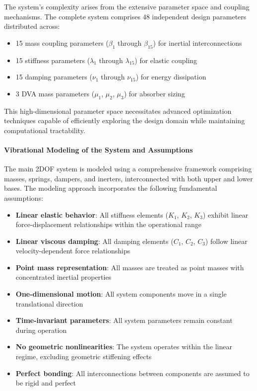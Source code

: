 \documentclass[12pt,a4paper]{article}
\begin{document}
The system's complexity arises from the extensive parameter space and coupling mechanisms. The complete system comprises 48 independent design parameters distributed across:
\begin{itemize}
    \item 15 mass coupling parameters ($\beta_1$ through $\beta_{15}$) for inertial interconnections
    \item 15 stiffness parameters ($\lambda_1$ through $\lambda_{15}$) for elastic coupling
    \item 15 damping parameters ($\nu_1$ through $\nu_{15}$) for energy dissipation
    \item 3 DVA mass parameters ($\mu_1$, $\mu_2$, $\mu_3$) for absorber sizing
\end{itemize}

This high-dimensional parameter space necessitates advanced optimization techniques capable of efficiently exploring the design domain while maintaining computational tractability.

\paragraph{Vibrational Modeling of the System and Assumptions}

The main 2DOF system is modeled using a comprehensive framework comprising masses, springs, dampers, and inerters, interconnected with both upper and lower bases. The modeling approach incorporates the following fundamental assumptions:

\begin{itemize}
    \item \textbf{Linear elastic behavior}: All stiffness elements ($K_1$, $K_2$, $K_3$) exhibit linear force-displacement relationships within the operational range
    \item \textbf{Linear viscous damping}: All damping elements ($C_1$, $C_2$, $C_3$) follow linear velocity-dependent force relationships
    \item \textbf{Point mass representation}: All masses are treated as point masses with concentrated inertial properties
    \item \textbf{One-dimensional motion}: All system components move in a single translational direction
    \item \textbf{Time-invariant parameters}: All system parameters remain constant during operation
    \item \textbf{No geometric nonlinearities}: The system operates within the linear regime, excluding geometric stiffening effects
    \item \textbf{Perfect bonding}: All interconnections between components are assumed to be rigid and perfect
\end{itemize}
\end{document}
